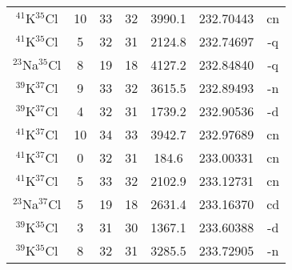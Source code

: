 \begin{table*}[htp]
\begin{tabular}{ccccccc}
$^{41}$K$^{35}$Cl & 10 & 33 & 32 & 3990.1 & 232.70443 & cn \\
$^{41}$K$^{35}$Cl & 5 & 32 & 31 & 2124.8 & 232.74697 & -q \\
$^{23}$Na$^{35}$Cl & 8 & 19 & 18 & 4127.2 & 232.84840 & -q \\
$^{39}$K$^{37}$Cl & 9 & 33 & 32 & 3615.5 & 232.89493 & -n \\
$^{39}$K$^{37}$Cl & 4 & 32 & 31 & 1739.2 & 232.90536 & -d \\
$^{41}$K$^{37}$Cl & 10 & 34 & 33 & 3942.7 & 232.97689 & cn \\
$^{41}$K$^{37}$Cl & 0 & 32 & 31 & 184.6 & 233.00331 & cn \\
$^{41}$K$^{37}$Cl & 5 & 33 & 32 & 2102.9 & 233.12731 & cn \\
$^{23}$Na$^{37}$Cl & 5 & 19 & 18 & 2631.4 & 233.16370 & cd \\
$^{39}$K$^{35}$Cl & 3 & 31 & 30 & 1367.1 & 233.60388 & -d \\
$^{39}$K$^{35}$Cl & 8 & 32 & 31 & 3285.5 & 233.72905 & -n \\
\hline
\end{tabular}

\par 
\end{table*}
